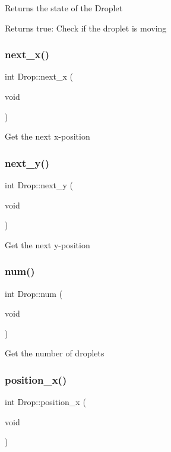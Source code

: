 Returns the state of the Droplet \begin{DoxyReturn}{Returns}
true\+: Check if the droplet is moving 
\end{DoxyReturn}
\mbox{\label{class_drop_a4146e3a66a4cc96d83cd25c3faeff64b}} 
\subsubsection{\texorpdfstring{next\+\_\+x()}{next\_x()}}
{\footnotesize\ttfamily int Drop\+::next\+\_\+x (\begin{DoxyParamCaption}\item[{void}]{ }\end{DoxyParamCaption})}

Get the next x-\/position \mbox{\label{class_drop_abcbcc7b38ef8c8e7e47dced87579d60e}} 
\subsubsection{\texorpdfstring{next\+\_\+y()}{next\_y()}}
{\footnotesize\ttfamily int Drop\+::next\+\_\+y (\begin{DoxyParamCaption}\item[{void}]{ }\end{DoxyParamCaption})}

Get the next y-\/position \mbox{\label{class_drop_a15b23e4aff0711c9b96f550e74ed72fa}} 
\subsubsection{\texorpdfstring{num()}{num()}}
{\footnotesize\ttfamily int Drop\+::num (\begin{DoxyParamCaption}\item[{void}]{ }\end{DoxyParamCaption})}

Get the number of droplets \mbox{\label{class_drop_a879a7ee2a43d7ae488eca0b266b45388}} 
\subsubsection{\texorpdfstring{position\+\_\+x()}{position\_x()}}
{\footnotesize\ttfamily int Drop\+::position\+\_\+x (\begin{DoxyParamCaption}\item[{void}]{ }\end{DoxyParamCaption})}

